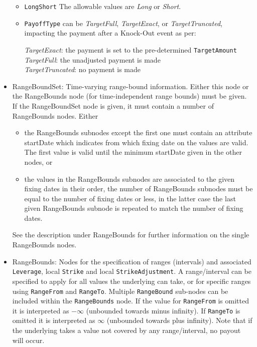 \begin{itemize}
\begin{itemize}
\item \lstinline!LongShort! The allowable values are \emph{Long} or \emph{Short}.
\item \lstinline!PayoffType! can be \emph{TargetFull}, \emph{TargetExact}, or \emph{TargetTruncated}, impacting the payment after a Knock-Out event as per:
      
     \emph{TargetExact}: the payment is set to the pre-determined \lstinline!TargetAmount!\\
     \emph{TargetFull}: the unadjusted payment is made\\
     \emph{TargetTruncated}: no payment is made
\end{itemize}

    \item RangeBoundSet: Time-varying range-bound information. Either this node or the RangeBounds node (for time-independent range bounds) must be given. If the RangeBoundSet node is given, it must contain a number of RangeBounds nodes. Either
     \begin{itemize}
       \item the RangeBounds subnodes except the first one must contain an attribute startDate which indicates from
         which fixing date on the values are valid. The first value is valid until the minimum startDate given in the
         other nodes, or
       \item the values in the RangeBounds subnodes are associated to the given fixing dates in their order, the number
         of RangeBounds subnodes must be equal to the number of fixing dates or less, in the latter case the last given
         RangeBounds subnode is repeated to match the number of fixing dates.
     \end{itemize}
     See the description under RangeBounds for further information on the single RangeBounds nodes.

    \item RangeBounds: Nodes for the specification of ranges (intervals) and associated \lstinline!Leverage!, local
      \lstinline!Strike! and local \lstinline!StrikeAdjustment!. A range/interval can be specified to apply for all
      values the underlying can take, or for specific ranges using \lstinline!RangeFrom! and
      \lstinline!RangeTo!. Multiple \lstinline!RangeBound! sub-nodes can be included within the \lstinline!RangeBounds!
      node. If the value for \lstinline!RangeFrom! is omitted it is interpreted as $-\infty$ (unbounded towards minus
      infinity). If \lstinline!RangeTo! is omitted it is interpreted as $\infty$ (unbounded towards plus infinity).
      Note that if the underlying takes a value not covered by any range/interval, no payout will occur.
    

\end{itemize}
